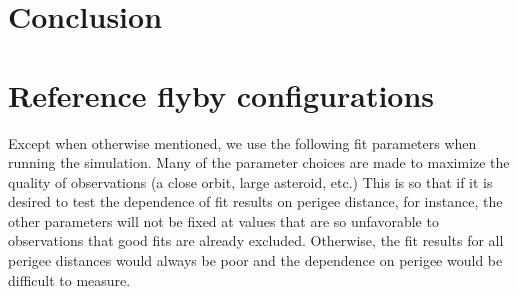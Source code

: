 \documentclass{aastex631}
\begin{document}
\section{Conclusion}

\vspace{5mm}



\appendix

\section{Reference flyby configurations}
\label{app:reference-config}
Except when otherwise mentioned, we use the following fit parameters when running the simulation. Many of the parameter choices are made to maximize the quality of observations (a close orbit, large asteroid, etc.) This is so that if it is desired to test the dependence of fit results on perigee distance, for instance, the other parameters will not be fixed at values that are so unfavorable to observations that good fits are already excluded. Otherwise, the fit results for all perigee distances would always be poor and the dependence on perigee would be difficult to measure.
\end{document}
